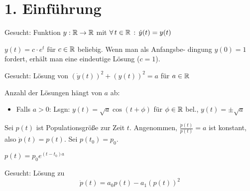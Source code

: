\documentclass{cheat-sheet}
\begin{document}

\section{1. Einführung}


\iffalse
\begin{bsp}
  Gesucht: Funktion $y : \mathbb{R} \to \mathbb{R}$ mit $\forall \, {t \in \mathbb{R}} \,:\, \dot{y}(t) = y(t)$\\
\end{bsp}

\begin{lsg}
  $y(t) = c \cdot e^t$ für $c \in \mathbb{R}$ beliebig. Wenn man als Anfangsbe- dingung $y(0) = 1$ fordert, erhält man eine eindeutige Lösung ($c = 1$).
\end{lsg}

\begin{bsp}
  Gesucht: Lösung von $\left(\dot{y}(t)\right)^2 + \left(y(t)\right)^2 = a$ für $a \in \mathbb{R}$\\
\end{bsp}

\begin{lsg}
  Anzahl der Lösungen hängt von $a$ ab:
  \begin{itemize}
    \item Falls $a > 0$: Lsgn: $y(t) = \sqrt{a} \cos(t + \phi)$ für $\phi \in \mathbb{R}$ bel., $y(t) = \pm \sqrt{a}$
  \end{itemize}
\end{lsg}

\begin{bsp}
  Sei $p(t)$ ist Populationsgröße zur Zeit $t$.
  Angenommen, $\tfrac{\dot{p}(t)}{p(t)} = a$ ist konstant, also $\dot{p}(t) = p(t)$. Sei $p(t_0) = p_0$.
\end{bsp}

\begin{lsg}
  $p(t) = p_0 e^{(t-t_0) a}$
\end{lsg}

\begin{bsp}
  Gesucht: Lösung zu
  \[ \dot{p}(t) = a_0 p(t) - a_1 \left(p(t)\right)^2 \]
\end{bsp}
\end{document}
